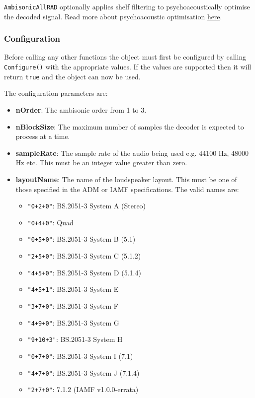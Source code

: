 \documentclass[12pt]{report}
\newcommand{\code}[1]{\texttt{#1}}
\begin{document}
\code{AmbisonicAllRAD} optionally applies shelf filtering to psychoacoustically optimise the decoded signal. Read more about psychoacoustic optimisation \href{AmbisonicOptimisation.md}{here}.

\subsubsection{Configuration}

Before calling any other functions the object must first be configured by calling \code{Configure()} with the appropriate values. If the values are supported then it will return \code{true} and the object can now be used.

The configuration parameters are:
\begin{itemize}
    \item \textbf{nOrder}: The ambisonic order from 1 to 3.
    \item \textbf{nBlockSize}: The maximum number of samples the decoder is expected to process at a time.
    \item \textbf{sampleRate}: The sample rate of the audio being used e.g. 44100 Hz, 48000 Hz etc. This must be an integer value greater than zero.
    \item \textbf{layoutName}: The name of the loudspeaker layout. This must be one of those specified in the ADM or IAMF specifications. The valid names are:
    \begin{itemize}
        \item \code{"0+2+0"}: BS.2051-3 System A (Stereo)
        \item \code{"0+4+0"}: Quad
        \item \code{"0+5+0"}: BS.2051-3 System B (5.1)
        \item \code{"2+5+0"}: BS.2051-3 System C (5.1.2)
        \item \code{"4+5+0"}: BS.2051-3 System D (5.1.4)
        \item \code{"4+5+1"}: BS.2051-3 System E
        \item \code{"3+7+0"}: BS.2051-3 System F
        \item \code{"4+9+0"}: BS.2051-3 System G
        \item \code{"9+10+3"}: BS.2051-3 System H
        \item \code{"0+7+0"}: BS.2051-3 System I (7.1)
        \item \code{"4+7+0"}: BS.2051-3 System J (7.1.4)
        \item \code{"2+7+0"}: 7.1.2 (IAMF v1.0.0-errata)

\end{itemize}
\end{itemize}
\end{document}
